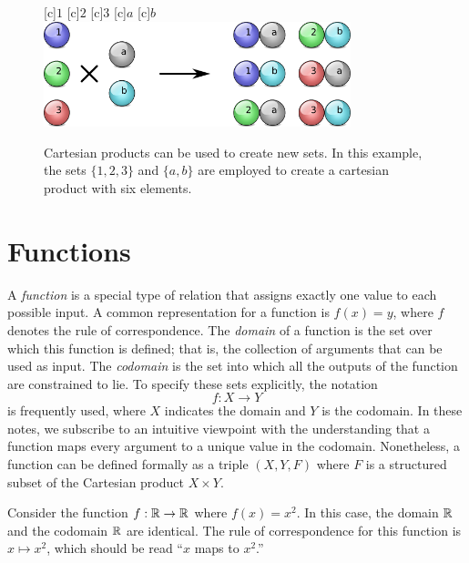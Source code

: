 \begin{figure}[htb]
\begin{center}
\begin{psfrags}
[c]{$1$}
[c]{$2$}
[c]{$3$}
[c]{$a$}
[c]{$b$}
\includegraphics[height=3.06cm]{Figures/1Chapter/cartesianproduct}
\end{psfrags}
\caption{Cartesian products can be used to create new sets.
In this example, the sets $\{ 1, 2, 3 \}$ and $\{ a, b \}$ are employed to create a cartesian product with six elements.}
\end{center}
\end{figure}


\section{Functions}

A \emph{function} is a special type of relation that assigns exactly one value to each possible input.
A common representation for a function is $f(x) = y$, where $f$ denotes the rule of correspondence.
The \emph{domain} of a function is the set over which this function is defined; that is, the collection of arguments that can be used as input.
The \emph{codomain} is the set into which all the outputs of the function are constrained to lie.
To specify these sets explicitly, the notation
\begin{equation*}
f: X \rightarrow Y
\end{equation*}
is frequently used, where $X$ indicates the domain and $Y$ is the codomain.
In these notes, we subscribe to an intuitive viewpoint with the understanding that a function maps every argument to a unique value in the codomain.
Nonetheless, a function can be defined formally as a triple $(X, Y, F)$ where $F$ is a structured subset of the Cartesian product $X \times Y$.

\begin{example}
Consider the function $f: \mathbb{R} \rightarrow \mathbb{R}$ where $f(x) = x^2$.
In this case, the domain $\mathbb{R}$ and the codomain $\mathbb{R}$ are identical.
The rule of correspondence for this function is $x \mapsto x^2$, which should be read ``$x$ maps to $x^2$.''
\end{example}

